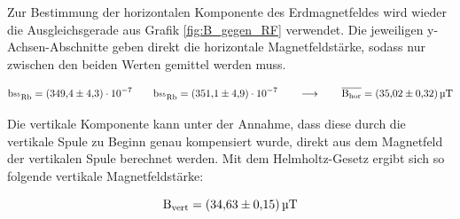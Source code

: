         Zur Bestimmung der horizontalen Komponente des Erdmagnetfeldes wird wieder die Ausgleichsgerade aus Grafik \autoref{fig:B_gegen_RF} verwendet. Die jeweiligen y-Achsen-Abschnitte geben direkt die 
        horizontale Magnetfeldstärke, sodass nur zwischen den beiden Werten gemittel werden muss.
        
        \begin{equation*}
            \text{b}_{\text{${}^{85}$Rb}}= \num{349.4\pm4.3 e-7} \qquad \text{b}_{\text{${}^{85}$Rb}}= \num{351.1\pm4.9 e-7} \qquad \longrightarrow \qquad  \overline{\text{B}_{\text{hor}}} = \SI{35.02 +- 0.32}{\micro\tesla}
        \end{equation*}
    
        \noindent

        Die vertikale Komponente kann unter der Annahme, dass diese durch die vertikale Spule zu Beginn genau kompensiert wurde, direkt aus dem Magnetfeld der vertikalen Spule berechnet werden. Mit dem 
        Helmholtz-Gesetz ergibt sich so folgende vertikale Magnetfeldstärke:

        \begin{equation*}
            \text{B}_{\text{vert}} = \SI{34.63 +- 0.15}{\micro\tesla}
        \end{equation*}

